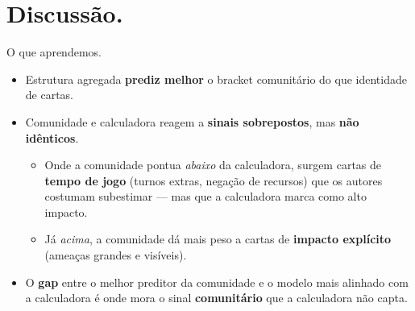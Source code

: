 \documentclass[aspectratio=149, dvipsnames]{beamer}
\begin{document}
\section{Discussão.}

\begin{frame}{O que aprendemos.}\pause
    \begin{itemize}
        \item<2-> Estrutura agregada \textbf{prediz melhor} o bracket comunitário do que identidade de cartas.
        \medskip
        \item<2-> Comunidade e calculadora reagem a \textbf{sinais sobrepostos}, mas \textbf{não idênticos}.
        \begin{itemize}\footnotesize
            \item<2-> Onde a comunidade pontua \textit{abaixo} da calculadora, surgem cartas de \textbf{tempo de jogo} (turnos extras, negação de recursos) que os autores costumam subestimar --- mas que a calculadora marca como alto impacto.
            \item<2-> Já \textit{acima}, a comunidade dá mais peso a cartas de \textbf{impacto explícito} (ameaças grandes e visíveis).
        \end{itemize}
        \medskip
        \item<2-> O \textbf{gap} entre o melhor preditor da comunidade e o modelo mais alinhado com a calculadora é onde mora o sinal \textbf{comunitário} que a calculadora não capta.
    \end{itemize}
    \vfill
\end{frame}
\end{document}
